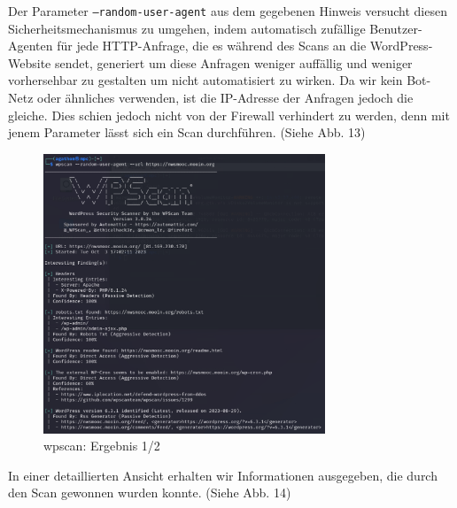 \documentclass{article}
\begin{document}
Der Parameter \texttt{--random-user-agent} aus dem gegebenen Hinweis versucht diesen 
Sicherheitsmechanismus zu umgehen, indem automatisch zufällige Benutzer-Agenten für jede 
HTTP-Anfrage, die es während des Scans an die WordPress-Website sendet, generiert um diese 
Anfragen weniger auffällig und weniger vorhersehbar zu gestalten um nicht automatisiert zu 
wirken. Da wir kein Bot-Netz oder ähnliches verwenden, ist die IP-Adresse der Anfragen jedoch 
die gleiche. Dies schien jedoch nicht von der Firewall verhindert zu werden, denn mit jenem 
Parameter lässt sich ein Scan durchführen. (Siehe Abb. 13)

\begin{figure}[H]
	\includegraphics[width=0.75\textwidth]{images/13}
	\centering
	\caption{wpscan: Ergebnis 1/2}
\end{figure}

In einer detaillierten Ansicht erhalten wir Informationen ausgegeben, die durch den Scan 
gewonnen wurden konnte. (Siehe Abb. 14)
\end{document}
